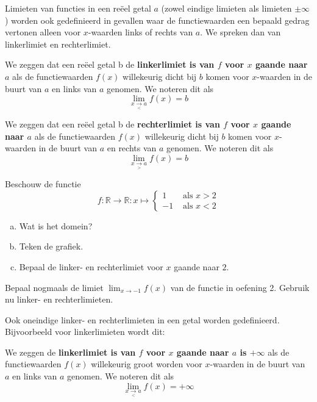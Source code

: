 \documentclass[12pt]{article}
\newenvironment{definitie}
{
  \vspace{0.4cm}
  \begin{mdframed}[nobreak=true,frametitle={Definitie}]
  }{%
  \end{mdframed}
}
\begin{document}
\begin{theorie}

Limieten van functies in een reëel getal $a$ (zowel eindige limieten als limieten $\pm\infty$) worden ook gedefinieerd in gevallen waar de functiewaarden een bepaald gedrag vertonen alleen voor $x$-waarden links of rechts van $a$. We spreken dan van linkerlimiet en rechterlimiet.

\begin{definitie}
  We zeggen dat een reëel getal b de {\bf linkerlimiet is van $f$ voor $x$ gaande naar $a$} als de functiewaarden $f(x)$ willekeurig dicht bij $b$ komen voor $x$-waarden in de buurt van $a$ en links van $a$ genomen. We noteren dit als
  $$\lim_{x\underset{<}{\to}a}f(x)=b$$
\end{definitie}

\begin{definitie}
  We zeggen dat een reëel getal b de {\bf rechterlimiet is van $f$ voor $x$ gaande naar $a$} als de functiewaarden $f(x)$ willekeurig dicht bij $b$ komen voor $x$-waarden in de buurt van $a$ en rechts van $a$ genomen. We noteren dit als
  $$\lim_{x\underset{>}{\to}a}f(x)=b$$
\end{definitie}

\end{theorie}

\begin{oefening}
  Beschouw de functie
  $$f:\mathbb{R}\to\mathbb{R}:x\mapsto\begin{cases}
    1 & \mbox{ als } x > 2\\
    -1& \mbox{ als } x < 2
  \end{cases}
  $$
  \begin{enumerate}[(a)]
  \item Wat is het domein?
  \item Teken de grafiek.
  \item Bepaal de linker- en rechterlimiet voor $x$ gaande naar $2$.
  \end{enumerate}
\end{oefening}

\begin{oefening}
  Bepaal nogmaals de limiet $\displaystyle\lim_{x\to-1} f(x)$ van de functie in oefening 2. Gebruik nu linker- en rechterlimieten.
\end{oefening}

\begin{theorie}

Ook oneindige linker- en rechterlimieten in een getal worden gedefinieerd. Bijvoorbeeld voor linkerlimieten wordt dit:

\begin{definitie}
  We zeggen de {\bf linkerlimiet is van $f$ voor $x$ gaande naar $a$ is $+\infty$} als de functiewaarden $f(x)$ willekeurig groot worden voor $x$-waarden in de buurt van $a$ en links van $a$ genomen. We noteren dit als
  $$\lim_{x\underset{<}{\to}a}f(x)=+\infty$$
\end{definitie}

\end{theorie}
\end{document}

